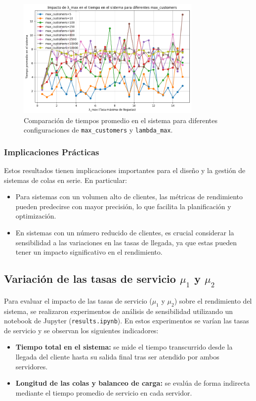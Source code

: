 \documentclass[12pt]{article}
\begin{document}
\begin{figure}[H]
    \centering
    \includegraphics[width=0.8\textwidth]{results1.1.png}
    \caption{Comparación de tiempos promedio en el sistema para diferentes configuraciones de \texttt{max\_customers} y \texttt{lambda\_max}.}
    \label{fig:results1.1}
\end{figure}

\subsubsection{Implicaciones Prácticas}
Estos resultados tienen implicaciones importantes para el diseño y la gestión de sistemas de colas en serie. En particular:
\begin{itemize}
    \item Para sistemas con un volumen alto de clientes, las métricas de rendimiento pueden predecirse con mayor precisión, lo que facilita la planificación y optimización.
    \item En sistemas con un número reducido de clientes, es crucial considerar la sensibilidad a las variaciones en las tasas de llegada, ya que estas pueden tener un impacto significativo en el rendimiento.
\end{itemize}

\subsection{Variación de las tasas de servicio \texorpdfstring{$\mu_1$}{mu1} y \texorpdfstring{$\mu_2$}{mu2}}
Para evaluar el impacto de las tasas de servicio (\(\mu_1\) y \(\mu_2\)) sobre el rendimiento del sistema, se realizaron experimentos de análisis de sensibilidad utilizando un notebook de Jupyter (\texttt{results.ipynb}). En estos experimentos se varían las tasas de servicio y se observan los siguientes indicadores:
\begin{itemize}
    \item \textbf{Tiempo total en el sistema:} se mide el tiempo transcurrido desde la llegada del cliente hasta su salida final tras ser atendido por ambos servidores.
    \item \textbf{Longitud de las colas y balanceo de carga:} se evalúa de forma indirecta mediante el tiempo promedio de servicio en cada servidor.
\end{itemize}
\end{document}
